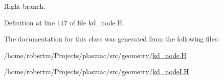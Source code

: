 Right branch. 



Definition at line 147 of file kd\+\_\+node.\+H.



The documentation for this class was generated from the following files\+:\begin{DoxyCompactItemize}
\item 
/home/robertm/\+Projects/plasmac/src/geometry/\hyperlink{kd__node_8H}{kd\+\_\+node.\+H}\item 
/home/robertm/\+Projects/plasmac/src/geometry/\hyperlink{kd__nodeI_8H}{kd\+\_\+node\+I.\+H}\end{DoxyCompactItemize}
